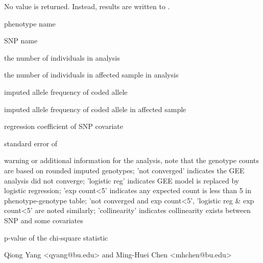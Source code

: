 \begin{Value}
No value is returned. Instead, results are written to .

\begin{ldescription}
\item[\code{phen }] phenotype name
\item[\code{snp }] SNP name
\item[\code{N }] the number of individuals in analysis
\item[\code{Nd }] the number of individuals in affected sample in analysis
\item[\code{AF }] imputed allele frequency of coded allele
\item[\code{AFd }] imputed allele frequency of coded allele in affected sample
\item[\code{beta }] regression coefficient of SNP covariate
\item[\code{se }] standard error of 
\item[\code{remark }] warning or additional information for the analysis, note that the genotype counts are based
on rounded imputed genotypes; 'not converged' indicates the 
GEE analysis did not converge; 'logistic reg' indicates GEE model is replaced by logistic regression;
'exp count<5' indicates any expected count is less than 5 in phenotype-genotype table; 'not converged 
and exp count<5', 'logistic reg \& exp count<5' are noted similarly; 'collinearity' indicates collinearity
exists between SNP and some covariates
\item[\code{pval }] p-value of the chi-square statistic
\end{ldescription}
\end{Value}
\begin{Author}\relax
Qiong Yang <qyang@bu.edu> and Ming-Huei Chen <mhchen@bu.edu>
\end{Author}


